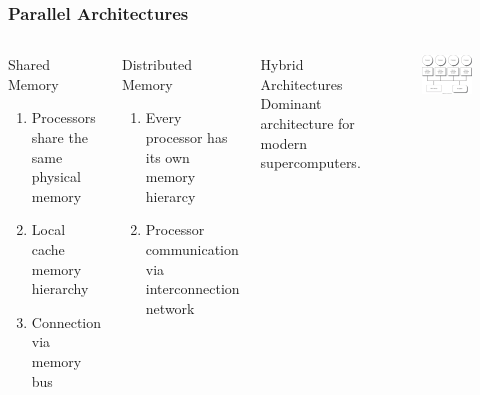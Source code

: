 \documentclass{beamer}
\begin{document}

\iffalse

\begin{frame}
\frametitle{Parallel Architectures}
\begin{columns}[c]

\linespread{0.5}
\begin{block}{Shared Memory}
\begin{enumerate}
\item {\fontsize{8}{6}\selectfont Processors share the same physical memory}
\item {\fontsize{8}{6}\selectfont Local cache memory hierarchy}
\item {\fontsize{8}{6}\selectfont Connection via memory bus}
\end{enumerate}
\end{block}

\begin{block}{Distributed Memory}
\begin{enumerate}
\item {\fontsize{8}{6}\selectfont Every processor has its own memory hierarcy}
\item {\fontsize{8}{6}\selectfont Processor communication via interconnection network}
\end{enumerate}
\end{block}

\begin{block}{Hybrid Architectures}
Dominant architecture for modern supercomputers.
\end{block}

\begin{figure}
\includegraphics[width=\linewidth,right]{shared_mem.jpg}
\end{figure}


\end{columns}
\end{frame}
\end{document}
